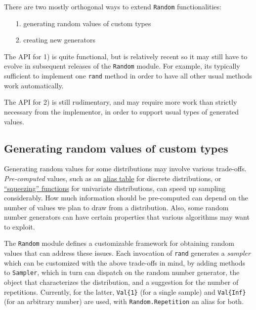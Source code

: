 There are two mostly orthogonal ways to extend \texttt{Random} functionalities:



\begin{itemize}
\item[1. ] generating random values of custom types


\item[2. ] creating new generators

\end{itemize}


The API for 1) is quite functional, but is relatively recent so it may still have to evolve in subsequent releases of the \texttt{Random} module. For example, it{\textquotesingle}s typically sufficient to implement one \texttt{rand} method in order to have all other usual methods work automatically.



The API for 2) is still rudimentary, and may require more work than strictly necessary from the implementor, in order to support usual types of generated values.



\hypertarget{7184618023384207012}{}


\subsection{Generating random values of custom types}



Generating random values for some distributions may involve various trade-offs. \emph{Pre-computed} values, such as an \href{https://en.wikipedia.org/wiki/Alias\_method}{alias table} for discrete distributions, or \href{https://en.wikipedia.org/wiki/Rejection\_sampling}{“squeezing” functions} for univariate distributions, can speed up sampling considerably. How much information should be pre-computed can depend on the number of values we plan to draw from a distribution. Also, some random number generators can have certain properties that various algorithms may want to exploit.



The \texttt{Random} module defines a customizable framework for obtaining random values that can address these issues. Each invocation of \texttt{rand} generates a \emph{sampler} which can be customized with the above trade-offs in mind, by adding methods to \texttt{Sampler}, which in turn can dispatch on the random number generator, the object that characterizes the distribution, and a suggestion for the number of repetitions. Currently, for the latter, \texttt{Val\{1\}} (for a single sample) and \texttt{Val\{Inf\}} (for an arbitrary number) are used, with \texttt{Random.Repetition} an alias for both.



